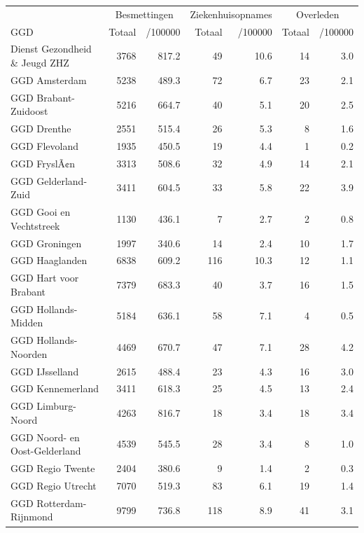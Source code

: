\documentclass[
  english,
  man,floatsintext]{apa6}
\begin{document}
\begin{table}
\centering\begingroup\fontsize{10}{12}\selectfont

\begin{threeparttable}
\begin{tabular}{lrrrrrr}
\toprule
\multicolumn{1}{c}{ } & \multicolumn{2}{c}{Besmettingen} & \multicolumn{2}{c}{Ziekenhuisopnames} & \multicolumn{2}{c}{Overleden} \\
\cmidrule(l{3pt}r{3pt}){2-3} \cmidrule(l{3pt}r{3pt}){4-5} \cmidrule(l{3pt}r{3pt}){6-7}
GGD & Totaal & /100000 & Totaal & /100000 & Totaal & /100000\\
\midrule
Dienst Gezondheid \& Jeugd ZHZ & 3768 & 817.2 & 49 & 10.6 & 14 & 3.0\\
GGD Amsterdam & 5238 & 489.3 & 72 & 6.7 & 23 & 2.1\\
GGD Brabant-Zuidoost & 5216 & 664.7 & 40 & 5.1 & 20 & 2.5\\
GGD Drenthe & 2551 & 515.4 & 26 & 5.3 & 8 & 1.6\\
GGD Flevoland & 1935 & 450.5 & 19 & 4.4 & 1 & 0.2\\
GGD FryslÃ¢n & 3313 & 508.6 & 32 & 4.9 & 14 & 2.1\\
GGD Gelderland-Zuid & 3411 & 604.5 & 33 & 5.8 & 22 & 3.9\\
GGD Gooi en Vechtstreek & 1130 & 436.1 & 7 & 2.7 & 2 & 0.8\\
GGD Groningen & 1997 & 340.6 & 14 & 2.4 & 10 & 1.7\\
GGD Haaglanden & 6838 & 609.2 & 116 & 10.3 & 12 & 1.1\\
GGD Hart voor Brabant & 7379 & 683.3 & 40 & 3.7 & 16 & 1.5\\
GGD Hollands-Midden & 5184 & 636.1 & 58 & 7.1 & 4 & 0.5\\
GGD Hollands-Noorden & 4469 & 670.7 & 47 & 7.1 & 28 & 4.2\\
GGD IJsselland & 2615 & 488.4 & 23 & 4.3 & 16 & 3.0\\
GGD Kennemerland & 3411 & 618.3 & 25 & 4.5 & 13 & 2.4\\
GGD Limburg-Noord & 4263 & 816.7 & 18 & 3.4 & 18 & 3.4\\
GGD Noord- en Oost-Gelderland & 4539 & 545.5 & 28 & 3.4 & 8 & 1.0\\
GGD Regio Twente & 2404 & 380.6 & 9 & 1.4 & 2 & 0.3\\
GGD Regio Utrecht & 7070 & 519.3 & 83 & 6.1 & 19 & 1.4\\
GGD Rotterdam-Rijnmond & 9799 & 736.8 & 118 & 8.9 & 41 & 3.1\\

\end{tabular}
\end{threeparttable}
\end{table}
\end{document}
